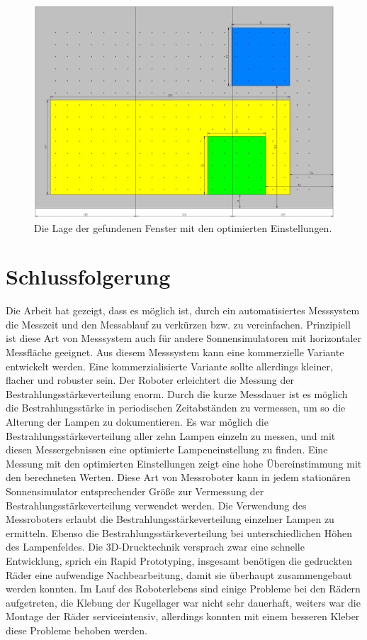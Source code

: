 \documentclass[a4paper,bibtotoc,oneside]{scrbook}
\begin{document}
\begin{figure}[htbp]
\centering
\includegraphics[width=140mm]{img/fensteropt.png}
\caption{Die Lage der gefundenen Fenster mit den optimierten Einstellungen.}\label{fopt}
\end{figure}



\FloatBarrier
 
\section{Schlussfolgerung}\thispagestyle{empty}

Die Arbeit hat gezeigt, dass es möglich ist, durch ein automatisiertes Messsystem die Messzeit und den Messablauf zu verkürzen bzw. zu vereinfachen.
Prinzipiell ist diese Art von Messsystem auch für andere Sonnensimulatoren mit horizontaler Messfläche geeignet.
Aus diesem Messsystem kann eine kommerzielle Variante entwickelt werden.
Eine kommerzialisierte Variante sollte allerdings kleiner, flacher und robuster sein.
Der Roboter erleichtert die Messung der Bestrahlungsstärkeverteilung enorm. Durch die kurze Messdauer ist es möglich die Bestrahlungsstärke in periodischen Zeitabständen zu vermessen, um so die Alterung der Lampen zu dokumentieren. 
Es war möglich die Bestrahlungsstärkeverteilung aller zehn Lampen einzeln zu messen, und mit diesen Messergebnissen eine optimierte Lampeneinstellung zu finden. Eine Messung mit den optimierten Einstellungen zeigt eine hohe Übereinstimmung mit den berechneten Werten. 
Diese Art von Messroboter kann in jedem stationären Sonnensimulator entsprechender Größe zur Vermessung der Bestrahlungsstärkeverteilung verwendet werden. 
Die Verwendung des Messroboters erlaubt die Bestrahlungsstärkeverteilung einzelner Lampen zu ermitteln.
Ebenso die Bestrahlungsstärkeverteilung bei unterschiedlichen Höhen des Lampenfeldes.
Die 3D-Drucktechnik versprach zwar eine schnelle Entwicklung, sprich ein Rapid Prototyping, insgesamt benötigen die gedruckten Räder eine aufwendige Nachbearbeitung, damit sie überhaupt zusammengebaut werden konnten. Im Lauf des Roboterlebens sind einige Probleme bei den Rädern aufgetreten, die Klebung der Kugellager war nicht sehr dauerhaft, weiters war die Montage der Räder serviceintensiv, allerdings konnten mit einem besseren Kleber diese Probleme behoben werden.
\end{document}
